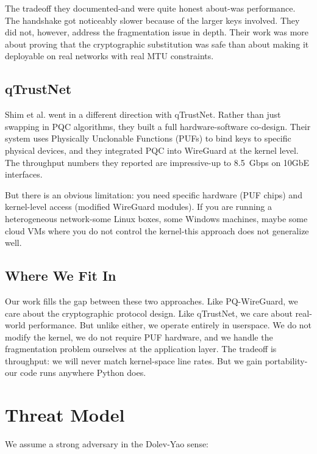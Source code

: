 \documentclass[10pt, conference, letterpaper]{IEEEtran}
\begin{document}
The tradeoff they documented-and were quite honest about-was performance. The handshake got noticeably slower because of the larger keys involved. They did not, however, address the fragmentation issue in depth. Their work was more about proving that the cryptographic substitution was safe than about making it deployable on real networks with real MTU constraints.

\subsection{qTrustNet}
Shim et al. \cite{shim2025qtrustnet} went in a different direction with qTrustNet. Rather than just swapping in PQC algorithms, they built a full hardware-software co-design. Their system uses Physically Unclonable Functions (PUFs) to bind keys to specific physical devices, and they integrated PQC into WireGuard at the kernel level. The throughput numbers they reported are impressive-up to 8.5~Gbps on 10GbE interfaces.

But there is an obvious limitation: you need specific hardware (PUF chips) and kernel-level access (modified WireGuard modules). If you are running a heterogeneous network-some Linux boxes, some Windows machines, maybe some cloud VMs where you do not control the kernel-this approach does not generalize well.

\subsection{Where We Fit In}
Our work fills the gap between these two approaches. Like PQ-WireGuard, we care about the cryptographic protocol design. Like qTrustNet, we care about real-world performance. But unlike either, we operate entirely in userspace. We do not modify the kernel, we do not require PUF hardware, and we handle the fragmentation problem ourselves at the application layer. The tradeoff is throughput: we will never match kernel-space line rates. But we gain portability-our code runs anywhere Python does.

\section{Threat Model}
We assume a strong adversary in the Dolev-Yao sense:
\end{document}
